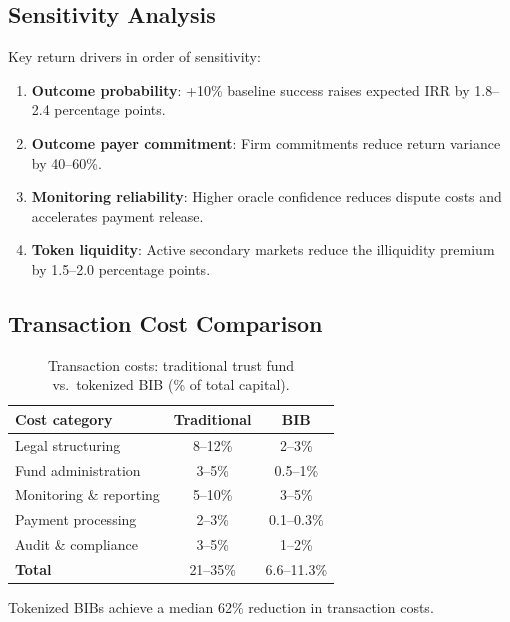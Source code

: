 \subsection{Sensitivity Analysis}

Key return drivers in order of sensitivity:
\begin{enumerate}
  \item \textbf{Outcome probability}: +10\% baseline success raises
    expected IRR by 1.8--2.4 percentage points.
  \item \textbf{Outcome payer commitment}: Firm commitments reduce
    return variance by 40--60\%.
  \item \textbf{Monitoring reliability}: Higher oracle confidence
    reduces dispute costs and accelerates payment release.
  \item \textbf{Token liquidity}: Active secondary markets reduce the
    illiquidity premium by 1.5--2.0 percentage points.
\end{enumerate}

\subsection{Transaction Cost Comparison}

\begin{table}[H]
\centering
\caption{Transaction costs: traditional trust fund vs.\ tokenized BIB
(\% of total capital).}
\label{tab:costs}
\begin{tabular}{lcc}
\toprule
\textbf{Cost category} & \textbf{Traditional} & \textbf{BIB} \\
\midrule
Legal structuring      & 8--12\%  & 2--3\% \\
Fund administration    & 3--5\%   & 0.5--1\% \\
Monitoring \& reporting & 5--10\% & 3--5\% \\
Payment processing     & 2--3\%   & 0.1--0.3\% \\
Audit \& compliance    & 3--5\%   & 1--2\% \\
\midrule
\textbf{Total}         & 21--35\% & 6.6--11.3\% \\
\bottomrule
\end{tabular}
\end{table}

Tokenized BIBs achieve a median 62\% reduction in transaction costs.



